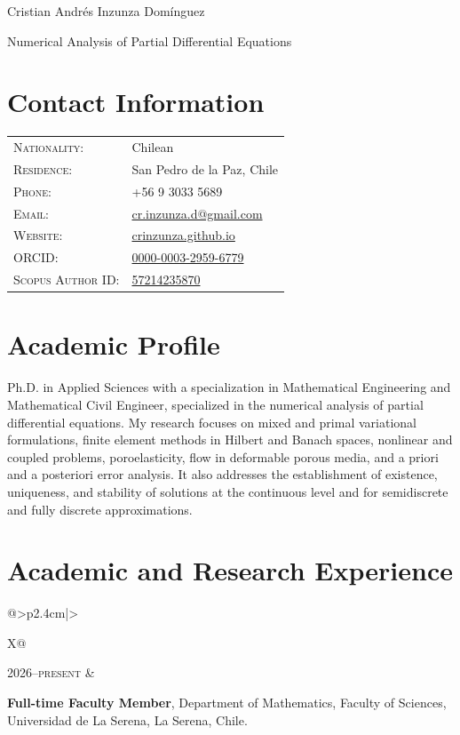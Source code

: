 \documentclass[letterpaper,12pt]{article}
\makeatletter
\newcommand{\CVEntry}[2]{%
\noindent\begin{tabularx}{\linewidth}{@{}>{\raggedleft\arraybackslash}p{2.4cm}|>{\raggedright\arraybackslash}X@{}}
\textsc{#1} & \begin{minipage}[t]{\linewidth}#2\end{minipage}
\end{tabularx}\vspace{0.45ex}}
\makeatother
\begin{document}
\begin{center}
    {\Huge Cristian Andr\'es Inzunza Dom\'inguez}\par
    \vspace{1mm}
    {\Large Numerical Analysis of Partial Differential Equations}\par
    \vspace{0.5mm}
\end{center}

\section{Contact Information}
\begin{tabularx}{\linewidth}{@{}>{\scshape}l L@{}}
Nationality: & Chilean \\
Residence: & San Pedro de la Paz, Chile \\
Phone: & +56 9 3033 5689 \\
Email: & \href{mailto:cr.inzunza.d@gmail.com}{cr.inzunza.d@gmail.com} \\
Website: & \href{https://crinzunza.github.io/}{crinzunza.github.io} \\
ORCID: & \href{https://orcid.org/0000-0003-2959-6779}{0000-0003-2959-6779} \\
Scopus Author ID: & \href{https://www.scopus.com/authid/detail.uri?authorId=57214235870}{57214235870}
\end{tabularx}

\section{Academic Profile}
Ph.D. in Applied Sciences with a specialization in Mathematical Engineering and Mathematical Civil Engineer, specialized in the numerical analysis of partial differential equations. My research focuses on mixed and primal variational formulations, finite element methods in Hilbert and Banach spaces, nonlinear and coupled problems, poroelasticity, flow in deformable porous media, and a priori and a posteriori error analysis. It also addresses the establishment of existence, uniqueness, and stability of solutions at the continuous level and for semidiscrete and fully discrete approximations.

\section{Academic and Research Experience}
\CVEntry{2026--present}{%
\textbf{Full-time Faculty Member}, Department of Mathematics, Faculty of Sciences, Universidad de La Serena, La Serena, Chile.}
\end{document}

